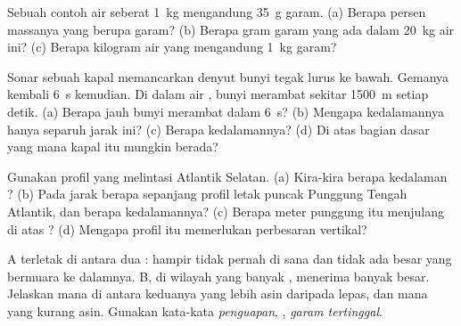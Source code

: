 \begin{exercise}[$\star\star$]\label{exo:g8:the-oceans:5}
Sebuah contoh air  seberat \qty{1}{kg} mengandung \qty{35}{g} garam.
(a) Berapa persen massanya yang berupa garam? (b) Berapa gram garam yang
ada dalam \qty{20}{kg} air ini? (c) Berapa kilogram air  yang
mengandung \qty{1}{kg} garam?
\end{exercise}

\begin{exercise}[$\star\star$]\label{exo:g8:the-oceans:6}
Sonar sebuah kapal memancarkan denyut bunyi tegak lurus ke bawah. Gemanya
kembali \qty{6}{s} kemudian. Di dalam air , bunyi merambat sekitar
\qty{1500}{m} setiap detik. (a) Berapa jauh bunyi merambat dalam
\qty{6}{s}? (b) Mengapa kedalamannya hanya separuh jarak ini? (c) Berapa
kedalamannya? (d) Di atas bagian dasar  yang mana kapal itu mungkin
berada?
\end{exercise}

\begin{exercise}[$\star\star$]\label{exo:g8:the-oceans:7}
Gunakan profil yang melintasi Atlantik Selatan. (a) Kira-kira berapa
kedalaman ? (b) Pada jarak berapa sepanjang profil
letak puncak Punggung Tengah Atlantik, dan berapa kedalamannya? (c) Berapa
meter punggung itu menjulang di atas ? (d) Mengapa profil itu
memerlukan perbesaran vertikal?
\end{exercise}

\begin{exercise}[$\star\star$]\label{exo:g8:the-oceans:8}
 A terletak di antara dua : hampir tidak pernah  di sana
dan tidak ada  besar yang bermuara ke dalamnya.  B, di wilayah
yang banyak , menerima banyak  besar. Jelaskan mana di antara
keduanya yang lebih asin daripada  lepas, dan mana yang kurang
asin. Gunakan kata-kata \emph{penguapan}, \emph{}, \emph{garam
tertinggal}.
\end{exercise}

